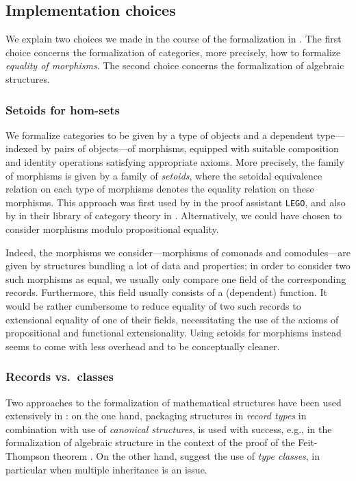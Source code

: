 \documentclass[conference,10pt]{IEEEtran}
\begin{document}
\subsection{Implementation choices}

We explain two choices we made in the course of the formalization in \coq. The first choice concerns
the formalization of categories, more precisely, how to formalize \emph{equality of morphisms}.
The second choice concerns the formalization of algebraic structures.

\subsubsection{Setoids for hom-sets}
We formalize categories to be given by a type of objects and a dependent type---indexed by pairs of objects---of morphisms,
equipped with suitable composition and identity operations satisfying appropriate axioms.
More precisely, the family of morphisms is given by a family of \emph{setoids}, where the setoidal equivalence relation on each
type of morphisms denotes the equality relation on these morphisms. This approach was first used by
\textcite{aczel_galois} in the proof assistant \texttt{LEGO}, and also by \textcite{concat}  in their library
of category theory in \coq.
Alternatively, we could have chosen to consider morphisms modulo propositional equality.

Indeed, the morphisms we consider---morphisms of comonads and comodules---are given by structures
bundling a lot of data and properties; in order to consider two such morphisms as equal, we usually only compare one field of the 
corresponding records. Furthermore, this field usually consists of a (dependent) function.
It would be rather cumbersome to reduce equality of two such records to extensional equality of one of their fields, 
necessitating the use of the axioms of propositional and functional extensionality.
Using setoids for morphisms instead seems to come with less overhead and to be conceptually cleaner.



\subsubsection{Records vs.\ classes}
Two approaches to the formalization of mathematical structures have been used extensively in \coq: on the one hand, packaging structures
in \emph{record types}  in combination with use of \emph{canonical structures}, is used with success, e.g., in 
the formalization of algebraic structure in the context of the proof of the Feit-Thompson theorem \parencite{DBLP:conf/tphol/GarillotGMR09}.
On the other hand, \textcite{DBLP:journals/mscs/SpittersW11} suggest the use of \emph{type classes}, in particular when multiple inheritance
is an issue.
\end{document}
